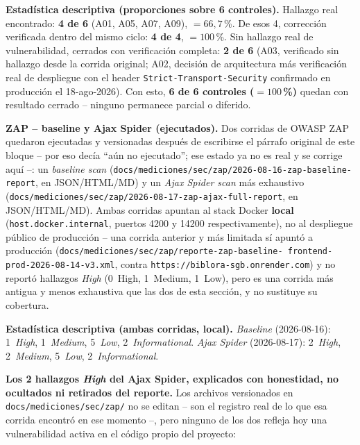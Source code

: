 \textbf{Estadística descriptiva (proporciones sobre 6 controles).}
Hallazgo real encontrado: \textbf{4 de 6} (A01, A05, A07, A09), $=66{,}7$\,\%.
De esos 4, corrección verificada dentro del mismo ciclo:
\textbf{4 de 4}, $=100$\,\%. Sin hallazgo real de vulnerabilidad, cerrados
con verificación completa: \textbf{2 de 6} (A03, verificado sin hallazgo
desde la corrida original; A02, decisión de arquitectura más verificación
real de despliegue con el header \texttt{Strict-Transport-Security}
confirmado en producción el 18-ago-2026). Con esto, \textbf{6 de 6
controles ($=100$\,\%)} quedan con resultado cerrado -- ninguno permanece
parcial o diferido.

\textbf{ZAP -- baseline y Ajax Spider (ejecutados).} Dos corridas de
OWASP ZAP quedaron ejecutadas y versionadas después de escribirse el
párrafo original de este bloque -- por eso decía ``aún no ejecutado'';
ese estado ya no es real y se corrige aquí --: un \emph{baseline scan}
(\texttt{docs/mediciones/sec/zap/2026-08-16-zap-baseline-report}, en
JSON/HTML/MD) y un \emph{Ajax Spider scan} más exhaustivo
(\texttt{docs/mediciones/sec/zap/2026-08-17-zap-ajax-full-report}, en
JSON/HTML/MD). Ambas corridas apuntan al stack Docker \textbf{local}
(\texttt{host.docker.internal}, puertos 4200 y 14200 respectivamente),
no al despliegue público de producción -- una corrida anterior y más
limitada sí apuntó a producción
(\texttt{docs/mediciones/sec/zap/reporte-zap-baseline-\allowbreak
frontend-prod-2026-08-14-v3.xml}, contra
\texttt{https://biblora-sgb.onrender.com}) y no reportó hallazgos
\emph{High} (0~High, 1~Medium, 1~Low), pero es una corrida más antigua y
menos exhaustiva que las dos de esta sección, y no sustituye su
cobertura.

\textbf{Estadística descriptiva (ambas corridas, local).}
\emph{Baseline} (2026-08-16): 1~\emph{High}, 1~\emph{Medium}, 5~\emph{Low},
2~\emph{Informational}. \emph{Ajax Spider} (2026-08-17): 2~\emph{High},
2~\emph{Medium}, 5~\emph{Low}, 2~\emph{Informational}.

\textbf{Los 2 hallazgos \emph{High} del Ajax Spider, explicados con
honestidad, no ocultados ni retirados del reporte.} Los archivos
versionados en \texttt{docs/mediciones/sec/zap/} no se editan -- son el
registro real de lo que esa corrida encontró en ese momento --, pero
ninguno de los dos refleja hoy una vulnerabilidad activa en el código
propio del proyecto:

